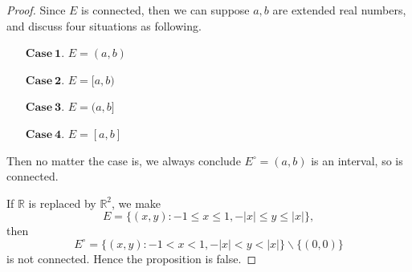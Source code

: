 \begin{Exercise}
\begin{proof}
Since $E$ is connected, then we can suppose $a,b$ are extended real numbers, and discuss four situations as following.
\begin{enumerate}
\item [$\mathbf{Case\ 1.}$]
$E = (a,b)$

\item [$\mathbf{Case\ 2.}$]
$E = [a,b)$

\item [$\mathbf{Case\ 3.}$]
$E = (a,b]$

\item [$\mathbf{Case\ 4.}$]
$E = [a,b]$

\end{enumerate}

Then no matter the case is, we always conclude $E^\circ = (a,b)$ is an interval, so is connected.

\vspace{2ex}

If $\mathbb{R}$ is replaced by $\mathbb{R}^2$, we make $$E = \{(x,y):-1\leq x \leq 1, -|x| \leq y \leq |x|\},$$ then $$E^\circ = \{(x,y):-1 < x < 1, -|x| < y < |x|\}\backslash \{(0,0)\}$$ is not connected. Hence the proposition is false.
\end{proof}
\end{Exercise}